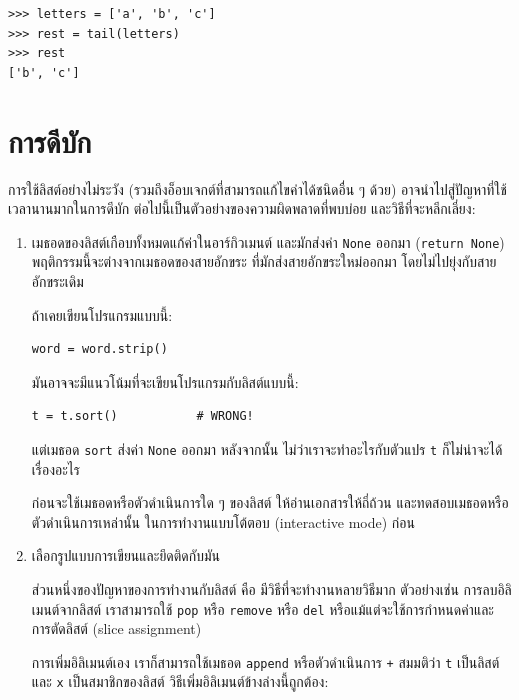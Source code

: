 \begin{verbatim}
>>> letters = ['a', 'b', 'c']
>>> rest = tail(letters)
>>> rest
['b', 'c']
\end{verbatim}



\section{การดีบัก}

การใช้ลิสต์อย่างไม่ระวัง (รวมถึงอ็อบเจกต์ที่สามารถแก้ไขค่าได้ชนิดอื่น ๆ ด้วย)
อาจนำไปสู่ปัญหาที่ใช้เวลานานมากในการดีบัก
ต่อไปนี้เป็นตัวอย่างของความผิดพลาดที่พบบ่อย และวิธีที่จะหลีกเลี่ยง:

\begin{enumerate}

\item เมธอดของลิสต์เกือบทั้งหมดแก้ค่าในอาร์กิวเมนต์ และมักส่งค่า \texttt{None} ออกมา (\texttt{return None})
พฤติกรรมนี้จะต่างจากเมธอดของสายอักขระ ที่มักส่งสายอักขระใหม่ออกมา โดยไม่ไปยุ่งกับสายอักขระเดิม

ถ้าเคยเขียนโปรแกรมแบบนี้:

\begin{verbatim}
word = word.strip()
\end{verbatim}

มันอาจจะมีแนวโน้มที่จะเขียนโปรแกรมกับลิสต์แบบนี้:

\begin{verbatim}
t = t.sort()           # WRONG!
\end{verbatim}

แต่เมธอด \texttt{sort} ส่งค่า \texttt{None} ออกมา
หลังจากนั้น ไม่ว่าเราจะทำอะไรกับตัวแปร \texttt{t} ก็ไม่น่าจะได้เรื่องอะไร

ก่อนจะใช้เมธอดหรือตัวดำเนินการใด ๆ ของลิสต์
ให้อ่านเอกสารให้ถี่ถ้วน และทดสอบเมธอดหรือตัวดำเนินการเหล่านั้น ในการทำงานแบบโต้ตอบ (interactive mode) ก่อน

\item เลือกรูปแบบการเขียนและยึดติดกับมัน

ส่วนหนึ่งของปัญหาของการทำงานกับลิสต์ คือ มีวิธีที่จะทำงานหลายวิธีมาก
ตัวอย่างเช่น การลบอิลิเมนต์จากลิสต์ เราสามารถใช้ \texttt{pop} หรือ \texttt{remove} หรือ \texttt{del} หรือแม้แต่จะใช้การกำหนดค่าและการตัดลิสต์ (slice assignment)

การเพิ่มอิลิเมนต์เอง เราก็สามารถใช้เมธอด \texttt{append} หรือตัวดำเนินการ \texttt{+}
สมมติว่า \texttt{t} เป็นลิสต์และ
\texttt{x} เป็นสมาชิกของลิสต์
วิธีเพิ่มอิลิเมนต์ข้างล่างนี้ถูกต้อง: 


\end{enumerate}
